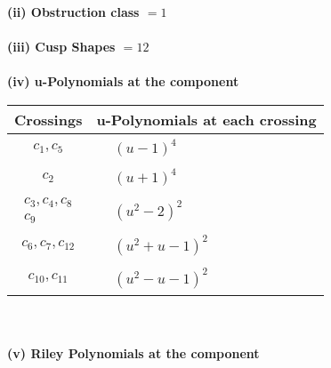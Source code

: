 \documentclass[1p]{elsarticle_modified}
\theoremstyle{definition}
\begin{document}
\flushleft \textbf{(ii) Obstruction class $= 1$}\\~\\
\flushleft \textbf{(iii) Cusp Shapes $= 12$}\\~\\
\newpage\renewcommand{\arraystretch}{1}
\flushleft \textbf{(iv) u-Polynomials at the component}\newline \\
\begin{tabular}{m{50pt}|m{274pt}}
Crossings & \hspace{64pt}u-Polynomials at each crossing \\
\hline $$\begin{aligned}c_{1},c_{5}\end{aligned}$$&$\begin{aligned}
&(u-1)^4
\end{aligned}$\\
\hline $$\begin{aligned}c_{2}\end{aligned}$$&$\begin{aligned}
&(u+1)^4
\end{aligned}$\\
\hline $$\begin{aligned}c_{3},c_{4},c_{8}\\c_{9}\end{aligned}$$&$\begin{aligned}
&(u^2-2)^2
\end{aligned}$\\
\hline $$\begin{aligned}c_{6},c_{7},c_{12}\end{aligned}$$&$\begin{aligned}
&(u^2+u-1)^2
\end{aligned}$\\
\hline $$\begin{aligned}c_{10},c_{11}\end{aligned}$$&$\begin{aligned}
&(u^2- u-1)^2
\end{aligned}$\\
\hline
\end{tabular}\\~\\
\newpage\renewcommand{\arraystretch}{1}
\flushleft \textbf{(v) Riley Polynomials at the component}\newline \\
\end{document}
